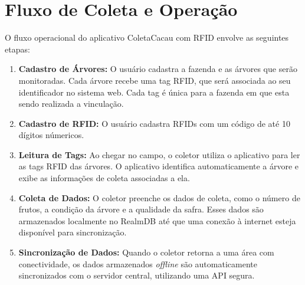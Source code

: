 \section{Fluxo de Coleta e Operação}
O fluxo operacional do aplicativo ColetaCacau com RFID envolve as seguintes etapas:

\begin{enumerate}
    \item \textbf{Cadastro de Árvores:} O usuário cadastra a fazenda e as árvores que serão monitoradas. Cada árvore recebe uma tag RFID, que será associada ao seu identificador no sistema web. Cada tag é única para a fazenda em que esta sendo realizada a vinculação.

    \item \textbf{Cadastro de RFID:} O usuário cadastra RFIDs com um código de até 10 dígitos númericos.

    \item \textbf{Leitura de Tags:} Ao chegar no campo, o coletor utiliza o aplicativo para ler as tags RFID das árvores. O aplicativo identifica automaticamente a árvore e exibe as informações de coleta associadas a ela.

    \item \textbf{Coleta de Dados:} O coletor preenche os dados de coleta, como o número de frutos, a condição da árvore e a qualidade da safra. Esses dados são armazenados localmente no RealmDB até que uma conexão à internet esteja disponível para sincronização.

    \item \textbf{Sincronização de Dados:} Quando o coletor retorna a uma área com conectividade, os dados armazenados \textit{offline} são automaticamente sincronizados com o servidor central, utilizando uma API segura.
\end{enumerate}

